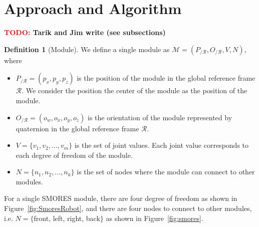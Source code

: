 \documentclass[conference]{IEEEtran}
\theoremstyle{definition}
\newtheorem{definition}{Definition}[section]
\newcommand{\TODO}[1]{ {\bf \textcolor{red}{TODO:} #1 }}
\begin{document}
\section{Approach and Algorithm}
\label{sec:approach}
\TODO{Tarik and Jim write (see subsections)}
\begin{definition}[Module] 
We define a single module  as $\mathcal{M}=(P_{/\mathcal{R}}, O_{/\mathcal{R}}, V, N)$, where
\begin{itemize}
\item $P_{/\mathcal{R}}=(p_x,p_y,p_z)$ is the position of the module in the global reference frame $\mathcal{R}$. We consider the position the center of the module as the position of the module.
\item $O_{/\mathcal{R}}=(o_w, o_x, o_y, o_z)$ is the orientation of the module represented by quaternion in the global reference frame $\mathcal{R}$.
\item $V=\{v_1, v_2, ..., v_m\}$ is the set of joint values. Each joint value corresponds to each degree of freedom of the module.
\item $N=\{n_1, n_2, ..., n_k\}$ is the set of nodes where the module can connect to other modules.
\end{itemize}
For a single SMORES module, there are four degree of freedom as shown in Figure~\ref{fig:SmoresRobot}, and there are four nodes to connect to other modules, i.e. $N=\{$front, left, right, back$\}$ as shown in Figure~\ref{fig:smores}.


\end{definition}
\end{document}
